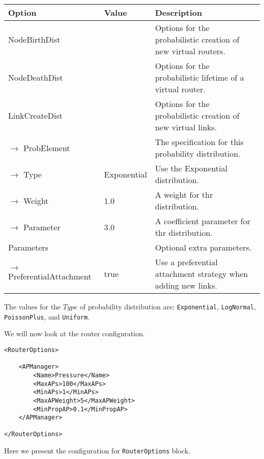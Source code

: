 {
\small

\begin{longtable}{ | p{3.4cm} | p{3.1cm} | p{7.3cm} | }

\hline
\textbf{Option} & \textbf{Value} & \textbf{Description} \\
\hline
NodeBirthDist &  & Options for the probabilistic creation of new
virtual routers. \\
\hline
NodeDeathDist &  & Options for the probabilistic lifetime of a
virtual router. \\
\hline
LinkCreateDist &  & Options for the probabilistic creation of new
virtual links. \\
\hline
$\rightarrow$ ProbElement & & The specification for this probability
distribution.\\
\hline
$\rightarrow$ Type & Exponential & Use the Exponential distribution. \\
\hline
$\rightarrow$ Weight & 1.0 & A weight for thr distribution. \\
\hline
$\rightarrow$ Parameter & 3.0 & A coefficient parameter for thr distribution. \\
\hline
Parameters &  &  Optional extra parameters. \\
\hline
$\rightarrow$ PreferentialAttachment & true & Use a preferential
attachment strategy when adding new links. \\
\hline
\end{longtable}

\normalsize
}


\noindent The values for the $Type$ of probability distribution are:
\texttt{Exponential}, 
\texttt{LogNormal},
\texttt{PoissonPlus}, and
\texttt{Uniform}.

We will now look at the router configuration.



\begin{lstlisting}[language=config, caption=routeroptions-with-ap.xml]
<RouterOptions>

    <APManager>
        <Name>Pressure</Name>
        <MaxAPs>100</MaxAPs>
        <MinAPs>1</MinAPs>
        <MaxAPWeight>5</MaxAPWeight>
        <MinPropAP>0.1</MinPropAP>
    </APManager> 

</RouterOptions>
\end{lstlisting}

\noindent Here we present the configuration for \texttt{RouterOptions}
block.


